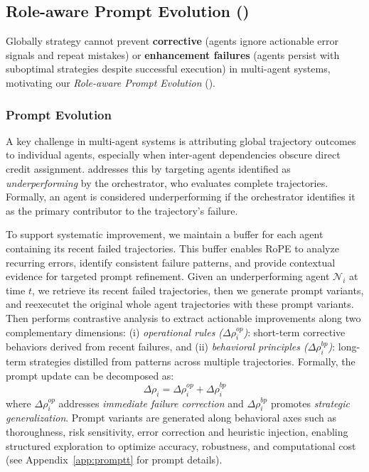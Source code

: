 \vspace{-6pt}
\subsection{Role-aware Prompt Evolution (\rope)}
\vspace{-6pt}
\label{sec: rapo}
Globally strategy cannot prevent \textbf{corrective} (agents ignore actionable error signals and repeat mistakes) or \textbf{enhancement failures} (agents persist with suboptimal strategies despite successful execution) \citep{zhang2025agent} in multi-agent systems, motivating our\textit{ Role-aware Prompt Evolution} (\rope).

\vspace{-6pt}
\subsubsection{Prompt Evolution}
\label{sec:agent_projected}
\vspace{-4pt}
A key challenge in multi-agent systems is attributing global trajectory outcomes to individual agents, especially when inter-agent dependencies obscure direct credit assignment. \rope addresses this by targeting agents identified as \textit{underperforming} by the orchestrator, who evaluates complete trajectories. Formally, an agent is considered underperforming if the orchestrator identifies it as the primary contributor to the trajectory’s failure.

To support systematic improvement, we maintain a buffer for each agent containing its recent failed trajectories. This buffer enables RoPE to analyze recurring errors, identify consistent failure patterns, and provide contextual evidence for targeted prompt refinement. Given an underperforming agent $\mathcal{N}_{i}$ at time $t$, we retrieve its recent failed trajectories, then we generate prompt variants, and reexecutet the original whole agent trajectories with these prompt variants. Then \rope performs contrastive analysis to extract actionable improvements along two complementary dimensions: (i) \textit{operational rules ($\Delta\rho_i^{op}$)}: short-term corrective behaviors derived from recent failures, and (ii) \textit{behavioral principles ($\Delta\rho_i^{bp}$)}: long-term strategies distilled from patterns across multiple trajectories. Formally, the prompt update can be decomposed as:
\vspace{-5pt}
\[
\Delta\rho_{i}=\Delta\rho_{i}^{op}+\Delta\rho_{i}^{bp}
\]
\vspace{-2pt}
where $\Delta\rho_{i}^{op}$ addresses \textit{immediate failure correction} and $\Delta\rho_{i}^{bp}$ promotes \textit{strategic generalization}. Prompt variants are generated along behavioral axes such as thoroughness, risk sensitivity, error correction and heuristic injection, enabling structured exploration to optimize accuracy, robustness, and computational cost (see Appendix~\ref{app:promptt} for prompt details).
\vspace{-5pt}

